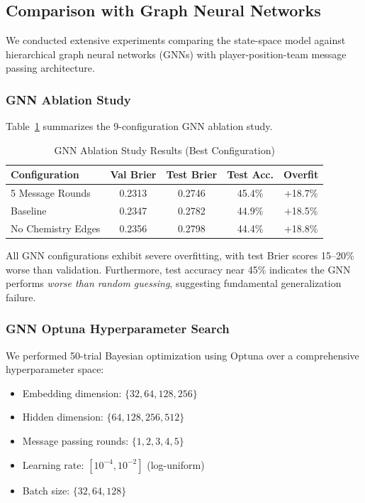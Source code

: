\subsection{Comparison with Graph Neural Networks}

We conducted extensive experiments comparing the state-space model against hierarchical graph neural networks (GNNs) with player-position-team message passing architecture.

\subsubsection{GNN Ablation Study}

Table~\ref{tab:gnn-ablation-results} summarizes the 9-configuration GNN ablation study.

\begin{table}[h]
\centering
\caption{GNN Ablation Study Results (Best Configuration)}
\label{tab:gnn-ablation-results}
\begin{tabular}{lcccc}
\toprule
\textbf{Configuration} & \textbf{Val Brier} & \textbf{Test Brier} & \textbf{Test Acc.} & \textbf{Overfit} \\
\midrule
5 Message Rounds & 0.2313 & 0.2746 & 45.4\% & +18.7\% \\
Baseline & 0.2347 & 0.2782 & 44.9\% & +18.5\% \\
No Chemistry Edges & 0.2356 & 0.2798 & 44.4\% & +18.8\% \\
\bottomrule
\end{tabular}
\end{table}

All GNN configurations exhibit severe overfitting, with test Brier scores 15--20\% worse than validation. Furthermore, test accuracy near 45\% indicates the GNN performs \textit{worse than random guessing}, suggesting fundamental generalization failure.

\subsubsection{GNN Optuna Hyperparameter Search}

We performed 50-trial Bayesian optimization using Optuna \citep{akiba2019optuna} over a comprehensive hyperparameter space:

\begin{itemize}
    \item Embedding dimension: $\{32, 64, 128, 256\}$
    \item Hidden dimension: $\{64, 128, 256, 512\}$
    \item Message passing rounds: $\{1, 2, 3, 4, 5\}$
    \item Learning rate: $[10^{-4}, 10^{-2}]$ (log-uniform)
    \item Batch size: $\{32, 64, 128\}$
\end{itemize}

